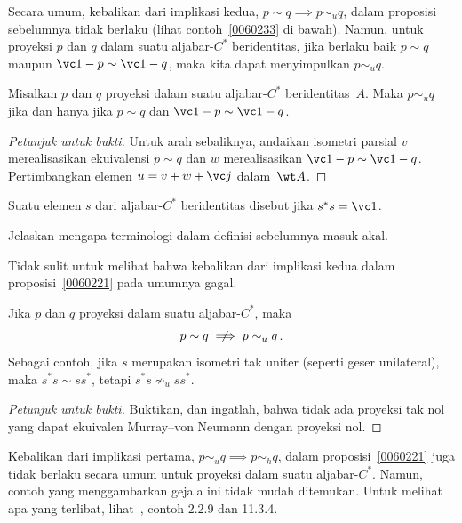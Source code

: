 Secara umum, kebalikan dari implikasi kedua, $p \sim q \implies p \sim_u q$, dalam proposisi sebelumnya tidak berlaku (lihat %
contoh~\ref{0060233} di bawah). Namun, untuk proyeksi $p$ dan $q$ dalam suatu aljabar-$C^*$ beridentitas, jika berlaku baik $p \sim q$ maupun
$\vc 1 - p \sim \vc 1 - q$, maka kita dapat menyimpulkan $p \sim_u q$.

\begin{prop}\label{0060224} Misalkan $p$ dan $q$ proyeksi dalam suatu aljabar-$C^*$ beridentitas~$A$. Maka $p \sim_u q$ jika dan hanya jika
$p \sim q$ dan $\vc 1 - p \sim \vc 1 - q$.
\end{prop}

\begin{proof}[\emph{Petunjuk untuk bukti}] Untuk arah sebaliknya, andaikan isometri parsial $v$ merealisasikan ekuivalensi $p \sim q$
dan $w$ merealisasikan $\vc 1 - p \sim \vc 1 - q$. Pertimbangkan elemen $u = v + w + \vc j$ dalam~$\wt A$.   \ns
\end{proof}

\begin{defn} Suatu elemen $s$ dari aljabar-$C^*$ beridentitas disebut
 jika $s^*s = \vc 1$.
\end{defn}

\begin{exer} Jelaskan mengapa terminologi dalam definisi sebelumnya masuk akal.
\end{exer}

Tidak sulit untuk melihat bahwa kebalikan dari implikasi kedua dalam proposisi~\ref{0060221} pada umumnya gagal.

\begin{exam}\label{0060233} Jika $p$ dan $q$ proyeksi dalam suatu aljabar-$C^*$, maka
   \[ p \sim q \,\,\,\,\not\!\!\!\!\implies p \sim_u q\,. \]
Sebagai contoh, jika $s$ merupakan isometri tak uniter (seperti geser unilateral), maka $s^*s \sim ss^*$, tetapi $s^*s \nsim_u ss^*$.
\end{exam}

\begin{proof}[\emph{Petunjuk untuk bukti}] Buktikan, dan ingatlah, bahwa tidak ada proyeksi tak nol yang dapat ekuivalen Murray--von Neumann
dengan proyeksi nol.   \ns
\end{proof}

\begin{rem} Kebalikan dari implikasi pertama, $p \sim_u q \implies p \sim_h q$, dalam proposisi~\ref{0060221} juga tidak berlaku %
secara umum untuk proyeksi dalam suatu aljabar-$C^*$. Namun, contoh yang menggambarkan gejala ini tidak mudah ditemukan. Untuk melihat
apa yang terlibat, lihat~\cite{RordamLL:2000}, contoh 2.2.9 dan 11.3.4.
\end{rem}

